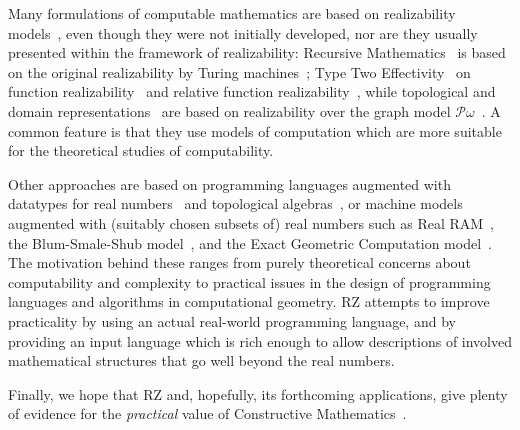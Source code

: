 Many formulations of computable mathematics are based on realizability
models~\cite{Bauer:00}, even though they were not initially developed,
nor are they usually presented within the framework of realizability:
Recursive Mathematics~\cite{ershov98:_handb_recur_mathem} is based on
the original realizability by Turing machines~\cite{KleeneSC:intint};
Type Two Effectivity~\cite{Wei00} on function
realizability~\cite{KleeneSC:fouim} and relative function
realizability~\cite{BirkedalL:devttc}, while topological and domain
representations~\cite{Bla97a,Bauer:Birkedal:Scott:98} are based on
realizability over the graph model
$\mathcal{P}\omega$~\cite{ScottD:dattl}. A common feature is
that they use models of computation which are more suitable for the
theoretical studies of computability. 

Other approaches are based on programming languages augmented with
datatypes for real numbers~\cite{Escardo:97,marcial-romero04:_seman}
and topological algebras~\cite{TZ98}, or machine models augmented with
(suitably chosen subsets of) real numbers such as Real
RAM~\cite{borodin75}, the Blum-Smale-Shub
model~\cite{blum98:_compl_real_comput}, and the Exact Geometric
Computation model~\cite{yap06:_theor_real_comput_egc}. The motivation
behind these ranges from purely theoretical concerns about
computability and complexity to practical issues in the design of
programming languages and algorithms in computational geometry. RZ
attempts to improve practicality by using an actual
real-world programming language, and by providing an input language
which is rich enough to allow descriptions of involved mathematical
structures that go well beyond the real numbers.

Finally, we hope that RZ and, hopefully, its forthcoming applications,
give plenty of evidence for the \emph{practical} value of Constructive
Mathematics~\cite{Bishop:Bridges:85}.



